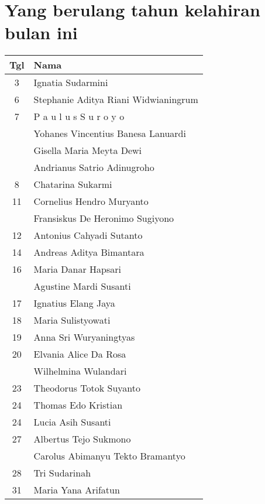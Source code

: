 
\section*{Yang berulang tahun kelahiran bulan ini}


\begin{longtable}{|c|l|} 
\hline Tgl & Nama \\ \hline
\endhead
3 & Ignatia Sudarmini \\  
6 & Stephanie Aditya Riani Widwianingrum \\  
7 & P a u l u s S u r o y o \\  
 & Yohanes Vincentius Banesa Lanuardi \\  
 & Gisella Maria Meyta Dewi \\  
 & Andrianus Satrio Adinugroho \\  
8 & Chatarina Sukarmi \\  
11 & Cornelius Hendro Muryanto \\  
 & Fransiskus De Heronimo Sugiyono \\  
12 & Antonius Cahyadi Sutanto \\  
14 & Andreas Aditya Bimantara \\  
16 & Maria Danar Hapsari \\  
 & Agustine Mardi Susanti \\  
17 & Ignatius Elang Jaya \\  
18 & Maria Sulistyowati \\  
19 & Anna Sri Wuryaningtyas \\  
20 & Elvania Alice Da Rosa \\  
 & Wilhelmina Wulandari \\  
23 & Theodorus Totok Suyanto \\  
24 & Thomas Edo Kristian \\  
24 & Lucia Asih Susanti \\  
27 & Albertus Tejo Sukmono \\  
 & Carolus Abimanyu Tekto Bramantyo \\  
28 &  Tri Sudarinah \\  
31 & Maria Yana Arifatun \\ \hline 

\end{longtable}
 
